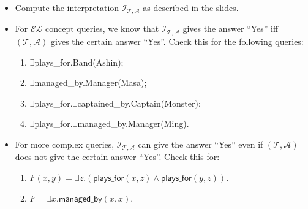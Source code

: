 \documentclass[12pt,a4paper]{article}
\newenvironment{problem}[2][{\color{red}Question}]{\begin{trivlist}
\item[\hskip \labelsep {\bfseries #1}\hskip \labelsep {\bfseries #2.}]}{\end{trivlist}}
\begin{document}
\begin{problem}{{\color{red}2}}
\begin{itemize}
\item[-] Compute the interpretation $\mathcal{I}_{\mathcal{T},\mathcal{A}}$ as described in the slides.
\item[-] For $\mathcal{EL}$ concept queries, we know that $\mathcal{I}_{\mathcal{T},\mathcal{A}}$ gives the answer ``Yes'' iff $(\mathcal{T}, \mathcal{A})$ gives the certain answer ``Yes''. Check this for the following queries:
\begin{enumerate}
\item \textsf{$\exists$plays\_for.Band(Ashin);}
\item \textsf{$\exists$managed\_by.Manager(Masa);}
\item \textsf{$\exists$plays\_for.$\exists$captained\_by.Captain(Monster);}
\item \textsf{$\exists$plays\_for.$\exists$managed\_by.Manager(Ming).}
\end{enumerate}
\item[-] For more complex queries, $\mathcal{I}_{\mathcal{T},\mathcal{A}}$ can give the answer ``Yes'' even if $(\mathcal{T}, \mathcal{A})$ does not give the certain answer ``Yes''. Check this for:
\begin{enumerate}
\item $F(x,y)=\exists z.(\textsf{plays\_for}(x,z)\wedge\textsf{plays\_for}(y,z))$.
\item $F=\exists x.\textsf{managed\_by}(x,x)$.
\end{enumerate}
\end{itemize}
\end{problem}
\end{document}
